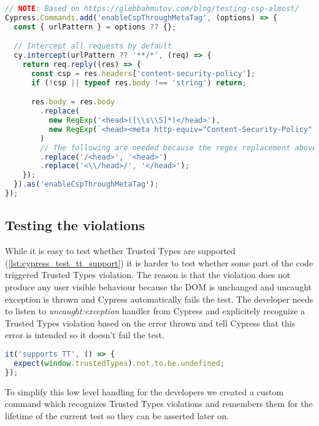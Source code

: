 \bigskip
\begin{lstlisting}[language=JavaScript, caption=Intercept requests and enable CSP header inside via meta tag]
// NOTE: Based on https://glebbahmutov.com/blog/testing-csp-almost/
Cypress.Commands.add('enableCspThroughMetaTag', (options) => {
  const { urlPattern } = options ?? {};

  // Intercept all requests by default
  cy.intercept(urlPattern ?? '**/*', (req) => {
    return req.reply((res) => {
      const csp = res.headers['content-security-policy'];
      if (!csp || typeof res.body !== 'string') return;

      res.body = res.body
        .replace(
          new RegExp('<head>([\\s\\S]*)</head>'),
          new RegExp(`<head><meta http-equiv="Content-Security-Policy" content="${csp}">$1</head>`).toString()
        )
        // The following are needed because the regex replacement above inserts some characters
        .replace('/<head>', '<head>')
        .replace('<\\/head>/', '</head>');
    });
  }).as('enableCspThroughMetaTag');
});
\end{lstlisting}

\subsection{Testing the violations}

While it is easy to test whether Trusted Types are supported (\ref{lst:cypress_test_tt_support}) it
is harder to test whether some part of the code triggered Trusted Types violation. The reason is
that the violation does not produce any user visible behaviour because the DOM is unchanged and
uncaught exception is thrown and Cypress automatically fails the test. The developer needs to listen
to \textit{uncaught:exception} handler from Cypress and explicitely recognize a Trusted Types
violation based on the error thrown and tell Cypress that this error is intended so it doesn't fail
the test.

\bigskip
\begin{lstlisting}[language=JavaScript, caption=Test Trusted Types support, label={lst:cypress_test_tt_support}]
it('supports TT', () => {
  expect(window.trustedTypes).not.to.be.undefined;
});
\end{lstlisting}

To simplify this low level handling for the developers we created a custom command which
recognizes Trusted Types violations and remembers them for the lifetime of the current test so they
can be asserted later on.

